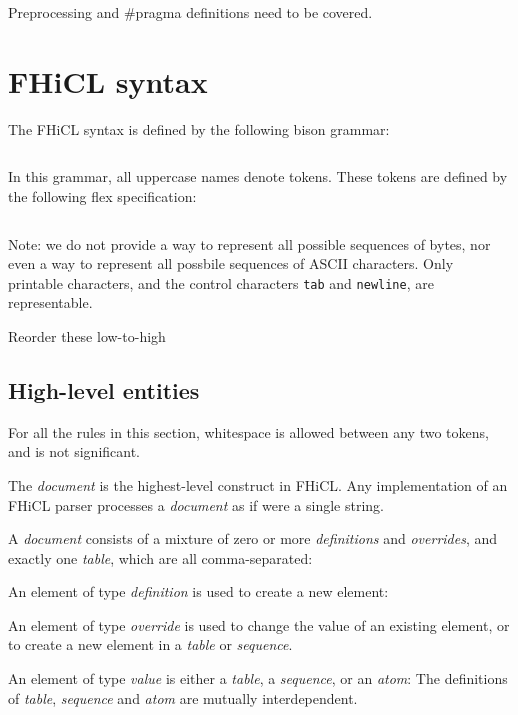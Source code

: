 \documentclass{memarticle}
\begin{document}
Preprocessing and \#pragma definitions need to be covered.

\chapter{FHiCL syntax}

The FHiCL syntax is defined by the following bison grammar:
\begin{verbatim}

\end{verbatim}

In this grammar,
all uppercase names denote tokens.
These tokens are defined by the following flex specification:
\begin{verbatim}

\end{verbatim}

\begin{fixme}
  Note: we do not provide a way to represent all possible sequences of
  bytes, nor even a way to represent all possbile sequences of ASCII
  characters. Only printable characters, and the control characters
  \texttt{tab} and \texttt{newline}, are representable.
\end{fixme}

\begin{fixme}
  Reorder these low-to-high
\end{fixme}

\section{High-level entities}

For all the rules in this section,
whitespace is allowed between any two tokens,
and is not significant.

The \emph{document} is the highest-level construct
in FHiCL.
Any implementation of an FHiCL parser
processes a \emph{document}
as if were a single string.

A \emph{document} consists of a mixture of
zero or more \emph{definitions}
and \emph{overrides},
and exactly one \emph{table},
which are all comma-separated:

An element of type \emph{definition} is used to
create a new element:

An element of type \emph{override} is used to
change the value of an existing element,
or to create a new element in a \emph{table} or \emph{sequence}.

An element of type \emph{value} is either a \emph{table},
a \emph{sequence},
or an \emph{atom}:
The definitions of \emph{table}, \emph{sequence} and \emph{atom} are mutually interdependent.
\end{document}
